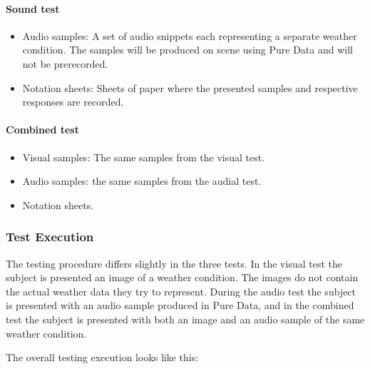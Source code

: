 \paragraph{Sound test} %
\label{par:sound_test}

\begin{itemize}
    \item Audio samples: A set of audio snippets each representing a separate weather condition. The samples will be produced on scene using Pure Data and will not be prerecorded.
    \item Notation sheets: Sheets of paper where the presented samples and respective responses are recorded.
\end{itemize}

\paragraph{Combined test} %
\label{par:combined_test}

\begin{itemize}
    \item Visual samples: The same samples from the visual test.
    \item Audio samples: the same samples from the audial test.
    \item Notation sheets.
\end{itemize}



\subsubsection{Test Execution} %
\label{ssub:test_execution}

The testing procedure differs slightly in the three tests. 
In the visual test the subject is presented an image of a weather condition. 
The images do not contain the actual weather data they try to represent. 
During the audio test the subject is presented with an audio sample produced in Pure Data, and in the combined test the subject is presented with both an image and an audio sample of the same weather condition. 

The overall testing execution looks like this:

